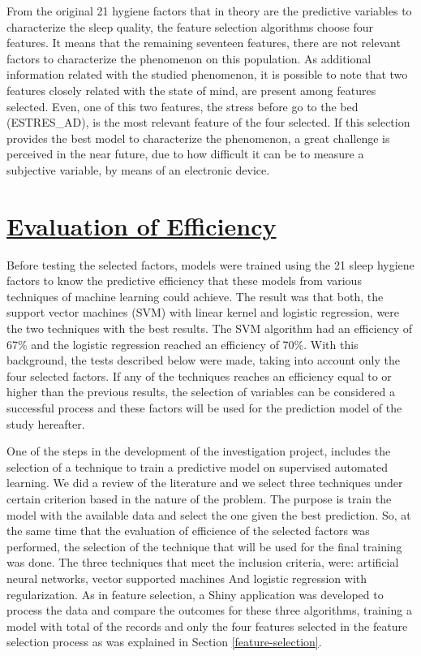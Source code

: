 \documentclass[]{book}
\begin{document}
From the original 21 hygiene factors that in theory are the predictive
variables to characterize the sleep quality, the feature selection
algorithms choose four features. It means that the remaining seventeen
features, there are not relevant factors to characterize the phenomenon
on this population. As additional information related with the studied
phenomenon, it is possible to note that two features closely related
with the state of mind, are present among features selected. Even, one
of this two features, the stress before go to the bed (ESTRES\_AD), is
the most relevant feature of the four selected. If this selection
provides the best model to characterize the phenomenon, a great
challenge is perceived in the near future, due to how difficult it can
be to measure a subjective variable, by means of an electronic device.

\hypertarget{evaluation-of-efficiency}{\chapter{\texorpdfstring{\protect\hyperlink{evaluation-of-efficiency}{Evaluation
of
Efficiency}}{Evaluation of Efficiency}}\label{evaluation-of-efficiency}}

Before testing the selected factors, models were trained using the 21
sleep hygiene factors to know the predictive efficiency that these
models from various techniques of machine learning could achieve. The
result was that both, the support vector machines (SVM) with linear
kernel and logistic regression, were the two techniques with the best
results. The SVM algorithm had an efficiency of 67\% and the logistic
regression reached an efficiency of 70\%. With this background, the
tests described below were made, taking into account only the four
selected factors. If any of the techniques reaches an efficiency equal
to or higher than the previous results, the selection of variables can
be considered a successful process and these factors will be used for
the prediction model of the study hereafter.

One of the steps in the development of the investigation project,
includes the selection of a technique to train a predictive model on
supervised automated learning. We did a review of the literature and we
select three techniques under certain criterion based in the nature of
the problem. The purpose is train the model with the available data and
select the one given the best prediction. So, at the same time that the
evaluation of efficience of the selected factors was performed, the
selection of the technique that will be used for the final training was
done. The three techniques that meet the inclusion criteria, were:
artificial neural networks, vector supported machines And logistic
regression with regularization. As in feature selection, a Shiny
application was developed to process the data and compare the outcomes
for these three algorithms, training a model with total of the records
and only the four features selected in the feature selection process as
was explained in Section \ref{feature-selection}.
\end{document}
